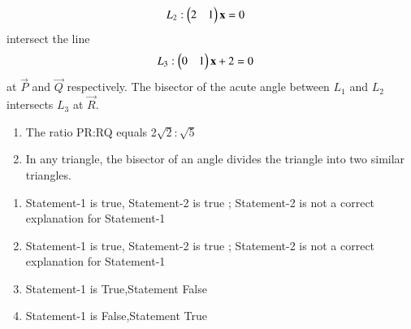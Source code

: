 \begin{enumerate}[label=\arabic*.,ref=\thesubsection.\theenumi]
\begin{align}
L_2: \begin{pmatrix}2 & 1\end{pmatrix} \mathbf {x} &=0
\end{align} 
intersect the line 
\begin{align}
L_3: \begin{pmatrix}0 & 1\end{pmatrix} \mathbf {x} + 2 &=0
\end{align} at $\vec{P}$ and $\vec{Q}$ respectively. 
The bisector of the acute angle between $L_1$ and $L_2$ intersects $L_3$ at $\vec{R}$.
\begin{enumerate}[label=Statement-\arabic*.,ref=\thesubsection.\theenumi]
\item The ratio PR:RQ equals 2$\sqrt2:\sqrt5$
\item In any triangle, the bisector of an angle divides the triangle into two similar triangles.
\end{enumerate}
\begin{enumerate}
    
     \item  Statement-1 is true, Statement-2 is true ; Statement-2 is not a correct explanation for Statement-1
     \item  Statement-1 is true, Statement-2 is true ;  Statement-2 is not a correct explanation for Statement-1
     \item  Statement-1 is True,Statement False
     \item  Statement-1 is False,Statement True\\
\end{enumerate}



\end{enumerate}
